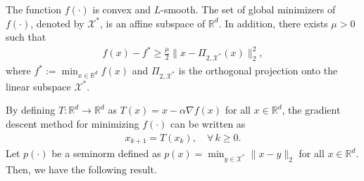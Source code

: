 \documentclass[11 pt]{article}
\begin{document}
	
	\begin{assumption}\label{as:quadratic_growth}
		The function $f(\cdot)$ is convex and $L$-smooth. The set of global minimizers of $f(\cdot)$, denoted by $\mathcal{X}^*$, is an affine subspace of $\mathbb{R}^d$. In addition, there exists $\mu>0$ such that
		\begin{align*}
			f(x) - f^* \geq \frac{\mu}{2} \| x - \Pi_{2,\mathcal{X}^*}(x) \|^2_2,
		\end{align*}
		where $f^*:=\min_{x\in\mathbb{R}^d}f(x)$ and $\Pi_{2,\mathcal{X}^*}$ is the orthogonal projection onto the linear subspace $\mathcal{X}^*$.
	\end{assumption}
	By defining $T: \mathbb{R}^d \to \mathbb{R}^d$ as $T(x)= x - \alpha \nabla f(x) $ for all $x\in\mathbb{R}^d$, the gradient descent method for minimizing $f(\cdot)$ can be written as
	\begin{align}\label{eq:QG}
		x_{k+1}= T(x_k), \quad \forall\,k\geq 0.
	\end{align}
	Let $p(\cdot)$ be a seminorm defined as $p(x) = \min_{y \in \mathcal{X^*}} \| x - y \|_2$ for all $x \in \mathbb{R}^d$. Then, we have the following result.
	
\end{document}

